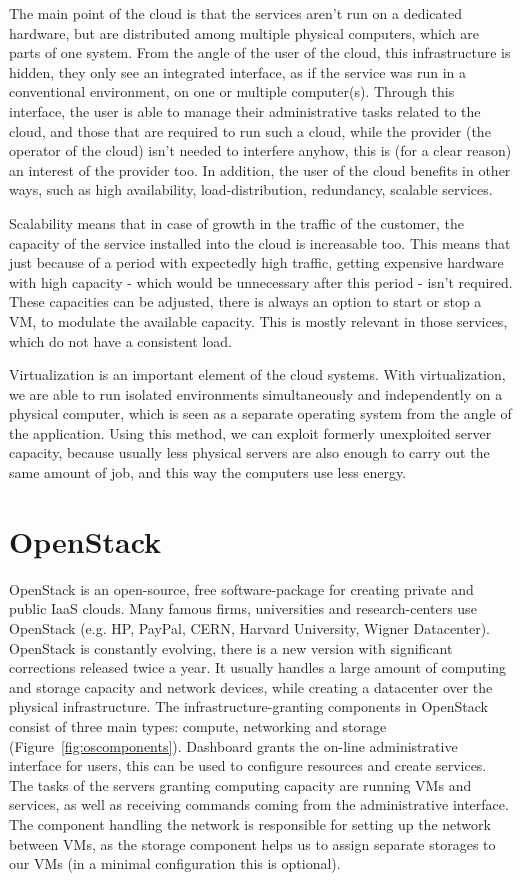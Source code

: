 \documentclass[a4paper]{article}
\begin{document}
The main point of the cloud is that the services aren't run on a dedicated hardware, but are distributed among multiple
physical computers, which are parts of one system.  From the angle of the user of the cloud, this infrastructure is
hidden, they only see an integrated interface, as if the service was run in a conventional environment, on one or
multiple computer(s). Through this interface, the user is able to manage their administrative tasks related to the
cloud, and those that are required to run such a cloud, while the provider (the operator of the cloud) isn't needed to
interfere anyhow, this is (for a clear reason) an interest of the provider too. In addition, the user of the cloud
benefits in other ways, such as high availability, load-distribution, redundancy, scalable services.

Scalability means that in case of growth in the traffic of the customer, the capacity of the service installed into the
cloud is increasable too. This means that just because of a period with expectedly high traffic, getting expensive
hardware with high capacity - which would be unnecessary after this period - isn't required. These capacities can be
adjusted, there is always an option to start or stop a VM, to modulate the available capacity. This is
mostly relevant in those services, which do not have a consistent load.

Virtualization is an important element of the cloud systems. With virtualization, we are able to run isolated
environments simultaneously and independently on a physical computer, which is seen as a separate operating system from
the angle of the application. Using this method, we can exploit formerly unexploited server capacity, because usually
less physical servers are also enough to carry out the same amount of job, and this way the computers use less energy.

\section{OpenStack}

OpenStack is an open-source, free software-package for creating private and public IaaS clouds. Many famous firms,
universities and research-centers use OpenStack (e.g. HP, PayPal, CERN, Harvard University, Wigner Datacenter).
OpenStack is constantly evolving, there is a new version with significant corrections released twice a year. It usually
handles a large amount of computing and storage capacity and network devices, while creating a datacenter over the
physical infrastructure. The infrastructure-granting components in OpenStack consist of three main types: compute,
networking and storage (Figure~\ref{fig:oscomponents}). Dashboard grants the on-line administrative interface for
users, this can be used to configure resources and create services. The tasks of the servers granting computing
capacity are running VMs and services, as well as receiving commands coming from the administrative
interface. The component handling the network is responsible for setting up the network between VMs, as
the storage component helps us to assign separate storages to our VMs (in a minimal configuration this is
optional).
\end{document}

